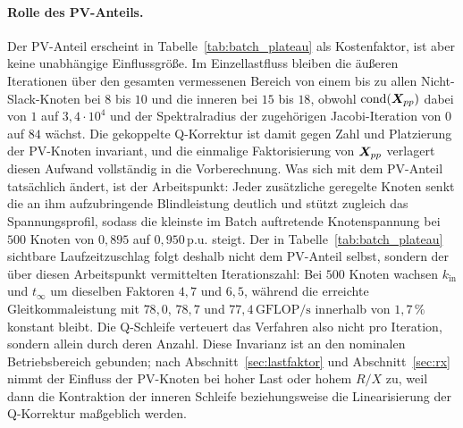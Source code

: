 \paragraph{Rolle des PV-Anteils.}
Der PV-Anteil erscheint in Tabelle~\ref{tab:batch_plateau} als Kostenfaktor,
ist aber keine unabhängige Einflussgröße. Im Einzellastfluss bleiben die
äußeren Iterationen über den gesamten vermessenen Bereich von einem bis zu
allen Nicht-Slack-Knoten bei $8$ bis $10$ und die inneren bei $15$ bis $18$,
obwohl $\mathrm{cond}(\boldsymbol{X}_{pp})$ dabei von $1$ auf $3{,}4\cdot10^{4}$ und
der Spektralradius der zugehörigen Jacobi-Iteration von $0$ auf $84$ wächst.
Die gekoppelte Q-Korrektur ist damit gegen Zahl und Platzierung der PV-Knoten
invariant, und die einmalige Faktorisierung von $\boldsymbol{X}_{pp}$ verlagert
diesen Aufwand vollständig in die Vorberechnung. Was sich mit dem PV-Anteil
tatsächlich ändert, ist der Arbeitspunkt: Jeder zusätzliche geregelte Knoten
senkt die an ihm aufzubringende Blindleistung deutlich und stützt zugleich das
Spannungsprofil, sodass die kleinste im Batch auftretende Knotenspannung bei
$500$ Knoten von $0{,}895$ auf $0{,}950\,\text{p.u.}$ steigt. Der in
Tabelle~\ref{tab:batch_plateau} sichtbare Laufzeitzuschlag folgt deshalb nicht
dem PV-Anteil selbst, sondern der über diesen Arbeitspunkt vermittelten
Iterationszahl: Bei $500$ Knoten wachsen $k_\mathrm{in}$ und $t_\infty$ um
dieselben Faktoren $4{,}7$ und $6{,}5$, während die erreichte
Gleitkommaleistung mit $78{,}0$, $78{,}7$ und $77{,}4\,\mathrm{GFLOP/s}$
innerhalb von $1{,}7\,\%$ konstant bleibt. Die Q-Schleife verteuert das
Verfahren also nicht pro Iteration, sondern allein durch deren Anzahl. Diese
Invarianz ist an den nominalen Betriebsbereich gebunden; nach
Abschnitt~\ref{sec:lastfaktor} und Abschnitt~\ref{sec:rx} nimmt der Einfluss
der PV-Knoten bei hoher Last oder hohem $R/X$ zu, weil dann die Kontraktion
der inneren Schleife beziehungsweise die Linearisierung der Q-Korrektur
maßgeblich werden.

